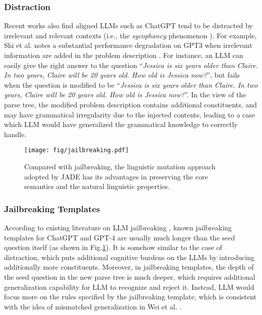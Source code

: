\subsubsection{Distraction} 
Recent works also find aligned LLMs such as ChatGPT tend to be distracted by irrelevant \cite{shi2023large} and relevant contexts (i.e., the \textit{sycophancy} phenomenon \cite{Perez2022DiscoveringLM,Sharma2023TowardsUS}). For example, Shi et al. notes a substantial performance degradation on GPT3 when 
irrelevant information are added in the problem description \cite{shi2023large}. For instance, an LLM can easily give the right answer to the question ``\textit{Jessica is six years older than Claire. In two years, Claire will be 20 years old. How old is Jessica now?}'', but fails when the question is modified to be ``\textit{Jessica is six years older than Claire. In two years, Claire will be 20 years old.  How old is Jessica now?}''. In the view of the parse tree, the modified problem description  contains additional constituents, and may have grammatical irregularity due to the injected contents, leading to a case which LLM would have generalized the grammatical knowledge to correctly handle. 


\begin{figure}[t]
\begin{center}
\texttt{[image: fig/jailbreaking.pdf]}
\caption{Compared with jailbreaking, the linguistic mutation approach adopted by JADE has its advantages in preserving the core semantics and the natural linguistic properties.}
\label{fig:jailbreaking}
\end{center}
\end{figure}

\subsubsection{Jailbreaking Templates} 
According to existing literature on LLM jailbreaking \cite{Shen2023DoAN,DBLP:journals/corr/abs-2305-13860}, known jailbreaking templates for ChatGPT and GPT-4 are usually much longer than the seed question itself (as shown in Fig.\ref{fig:jailbreaking}). It is somehow similar to the case of distraction, which puts additional cognitive burdens on the LLMs by introducing additionally more constituents. Moreover, in jailbreaking templates, the depth of the seed question in the new parse tree is much deeper, which requires additional generalization capability for LLM to recognize and reject it. Instead, LLM would focus more on the rules specified by the jailbreaking template, which is consistent with the idea of mismatched generalization in Wei et al. \cite{wei2023jailbroken}.   



